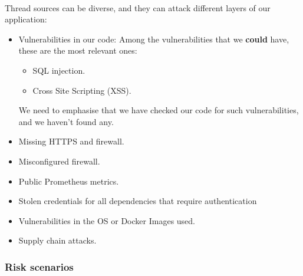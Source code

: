 \paragraph{} Thread sources can be diverse, and they can attack different layers of our application:
\begin{itemize}
	\item Vulnerabilities in our code: Among the vulnerabilities that we \textbf{could} have, these are the most relevant ones:
	      \begin{itemize}
		      \item SQL injection.
		      \item Cross Site Scripting (XSS).
	      \end{itemize}
	      We need to emphasise that we have checked our code for such vulnerabilities, and we haven't found any.
	\item Missing HTTPS and firewall.
	\item Misconfigured firewall.
	\item Public Prometheus metrics.
	\item Stolen credentials for all dependencies that require authentication
	\item Vulnerabilities in the OS or Docker Images used.
	\item Supply chain attacks.
\end{itemize}

\subsubsection{Risk scenarios}
